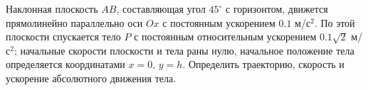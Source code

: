 Наклонная плоскость $AB$, составляющая угол $45^{\circ}$ с горизонтом,
движется прямолинейно параллельно оси $Ox$
с постоянным ускорением $0.1$ м/с$^2$.
По этой плоскости спускается тело $P$ с постоянным относительным ускорением
$0.1\sqrt{2}$ м/с$^2$; начальные скорости плоскости и тела раны нулю,
начальное положение тела определяется координатами $x = 0$, $y = h$.
Определить траекторию, скорость и ускорение абсолютного движения тела.
